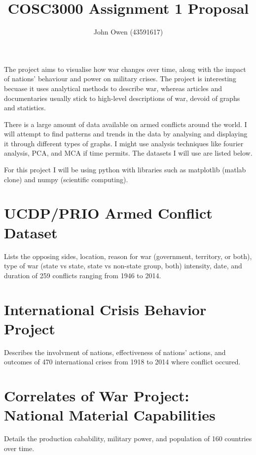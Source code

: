 \documentclass[12pt]{article}
\title{COSC3000 Assignment 1 Proposal \vspace{-0.5em}}
\author{John Owen (43591617) \vspace{-0.5em}}
\date{}
\begin{document}
\maketitle

The project aims to visualise how war changes over time, along with the
impact of nations' behaviour and power on military crises. The project is
interesting becuase it uses analytical methods to describe war, whereas
articles and documentaries usually stick to high-level descriptions of war,
devoid of graphs and statistics.

There is a large amount of data available on armed conflicts around the world. I
will attempt to find patterns and trends in the data by analysing and displaying
it through different types of graphs. I might use analysis techniques like
fourier analysis, PCA, and MCA if time permits. The datasets I will use are
listed below.

For this project I will be using python with libraries such as matplotlib
(matlab clone) and numpy (scientific computing).

\section*{UCDP/PRIO Armed Conflict Dataset}

Lists the opposing sides, location, reason for war (government, territory, or
both), type of war (state vs state, state vs non-state group, both) intensity,
date, and duration of 259 conflicts ranging from 1946 to 2014.

\section*{International Crisis Behavior Project}

Describes the involvment of nations, effectiveness of nations' actions,
and outcomes of 470 international crises from 1918 to 2014 where conflict
occured.

\section*{Correlates of War Project: National Material Capabilities}

Details the production cabability, military power, and population of 160
countries over time.
\end{document}
